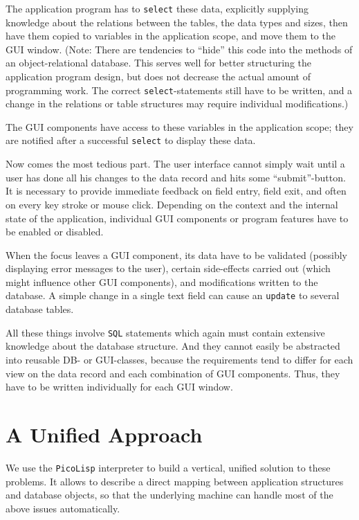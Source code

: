 The application program has to \texttt{select} these data, explicitly supplying
knowledge about the relations between the tables, the data types and
sizes, then have them copied to variables in the application scope, and
move them to the GUI window. (Note: There are tendencies to ``hide'' this
code into the methods of an object-relational database. This serves well
for better structuring the application program design, but does not
decrease the actual amount of programming work. The correct
\texttt{select}-statements still have to be written, and a change in the
relations or table structures may require individual modifications.)

The GUI components have access to these variables in the application
scope; they are notified after a successful \texttt{select} to display these
data.

Now comes the most tedious part. The user interface cannot simply wait
until a user has done all his changes to the data record and hits some
``submit''-button. It is necessary to provide immediate feedback on field
entry, field exit, and often on every key stroke or mouse click.
Depending on the context and the internal state of the application,
individual GUI components or program features have to be enabled or
disabled.

When the focus leaves a GUI component, its data have to be validated
(possibly displaying error messages to the user), certain side-effects
carried out (which might influence other GUI components), and
modifications written to the database. A simple change in a single text
field can cause an \texttt{update} to several database tables.

All these things involve \texttt{SQL} statements which again must contain
extensive knowledge about the database structure. And they cannot easily
be abstracted into reusable DB- or GUI-classes, because the requirements
tend to differ for each view on the data record and each combination of
GUI components. Thus, they have to be written individually for each GUI
window.

 
\section{A Unified Approach}
\label{sec:ul-unified-approach}


We use the \texttt{PicoLisp} interpreter to build a vertical, unified solution
to these problems. It allows to describe a direct mapping between
application structures and database objects, so that the underlying
machine can handle most of the above issues automatically.

